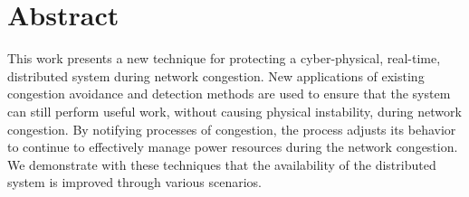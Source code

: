 \section{Abstract}

This work presents a new technique for protecting a cyber-physical, real-time, distributed system during network congestion. 
New applications of existing congestion avoidance and detection methods are used to ensure that the system can still perform useful work, without causing physical instability, during network congestion.
By notifying processes of congestion, the process adjusts its behavior to continue to effectively manage power resources during the network congestion.
We demonstrate with these techniques that the availability of the distributed system is improved through various scenarios.
